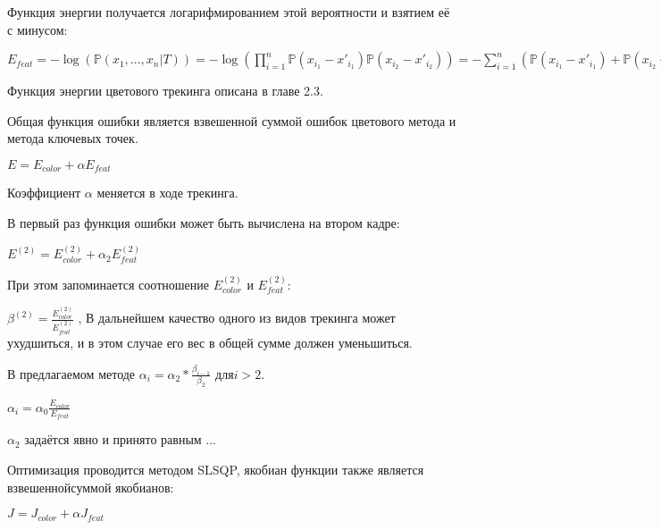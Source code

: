 Функция энергии получается логарифмированием этой вероятности и взятием её с
минусом:

$
    E_{feat} =
        - \log(\mathbb{P}(x_1, ..., x_n | T)) = 
- \log(\prod\limits_{i = 1}^n \mathbb{P}(x_{i_1} - x'_{i_1}) \mathbb{P}(x_{i_2}- x'_{i_2})) = - \sum\limits_{i = 1}^{n}( \mathbb{P}(x_{i_1} - x'_{i_1}) +
\mathbb{P}(x_{i_2} - x'_{i_2}))
$

Функция энергии цветового трекинга описана в главе 2.3. %

Общая функция ошибки является взвешенной суммой ошибок цветового метода и
метода ключевых точек. 

$E = E_{color} + \alpha E_{feat}$

Коэффициент $\alpha$ меняется в ходе трекинга.

В первый раз функция ошибки может быть вычислена на втором кадре:

$E^{(2)} = E_{color}^{(2)} + \alpha_2 E_{feat}^{(2)}$

При этом запоминается соотношение $E_{color}^{(2)}$ и $E_{feat}^{(2)}$:

$\beta^{(2)} = \frac{E_{color}^{(2)}}{E_{feat}^{(2)}}$
,
В дальнейшем качество одного из видов трекинга может ухудшиться, и в этом
случае его вес в общей сумме должен уменьшиться.

В предлагаемом методе $\alpha_i = \alpha_2 * \frac{\beta_{i - 1}}{\beta_2}$ для$i > 2$.

$\alpha_i = \alpha_0 \frac{E_{color}}{E_{feat}}$

$\alpha_2$ задаётся явно и принято равным ...

Оптимизация проводится методом SLSQP, якобиан функции также является
взвешеннойсуммой якобианов:

$J = J_{color} + \alpha J_{feat}$
